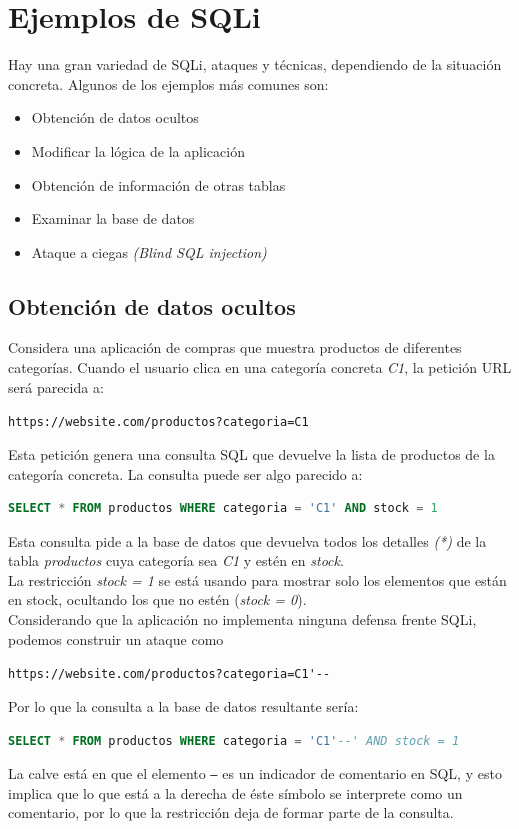 \documentclass[bibliography=totocnumbered]{scrartcl}
\begin{document}
\section{Ejemplos de SQLi}
Hay una gran variedad de SQLi, ataques y técnicas, dependiendo de la situación concreta. Algunos de los ejemplos más comunes son:
\begin{itemize}
    \item Obtención de datos ocultos
    \item Modificar la lógica de la aplicación
    \item Obtención de información de otras tablas
    \item Examinar la base de datos
    \item Ataque a ciegas \textit{(Blind SQL injection)}
\end{itemize}

\subsection{Obtención de datos ocultos}
Considera una aplicación de compras que muestra productos de diferentes categorías. Cuando el usuario clica en una categoría concreta \textit{C1}, la petición URL será parecida a:
\begin{center}
\nolinkurl{https://website.com/productos?categoria=C1}
\end{center}
Esta petición genera una consulta SQL que devuelve la lista de productos de la categoría concreta. La consulta puede ser algo parecido a:
\begin{lstlisting}[language=SQL]
        SELECT * FROM productos WHERE categoria = 'C1' AND stock = 1
\end{lstlisting}
Esta consulta pide a la base de datos que devuelva todos los detalles \textit{(*)} de la tabla \textit{productos} cuya categoría sea \textit{C1} y estén en \textit{stock}.\\
La restricción \textit{stock = 1} se está usando para mostrar solo los elementos que están en stock, ocultando los que no estén (\textit{stock = 0}).\\

Considerando que la aplicación no implementa ninguna defensa frente SQLi, podemos construir un ataque como
\begin{center}
\nolinkurl{https://website.com/productos?categoria=C1'--}
\end{center}
Por lo que la consulta a la base de datos resultante sería:
\begin{lstlisting}[language=SQL]
        SELECT * FROM productos WHERE categoria = 'C1'--' AND stock = 1
\end{lstlisting}
La calve está en que el elemento \textit{\texttt{--}} es un indicador de comentario en SQL, y esto implica que lo que está a la derecha de éste símbolo se interprete como un comentario, por lo que la restricción deja de formar parte de la consulta.\\
\end{document}
